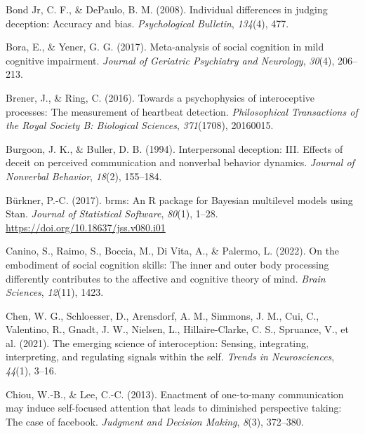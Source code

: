 \documentclass[
  man,mask,floatsintext]{apa6}
\newlength{\cslhangindent}
\newlength{\cslentryspacingunit} %
\newenvironment{CSLReferences}[2] %
 {%
  \setlength{\parindent}{0pt}
  \ifodd #1
  \let\oldpar\par
  \def\par{\hangindent=\cslhangindent\oldpar}
  \fi
  \setlength{\parskip}{#2\cslentryspacingunit}
 }%
 {}
\begin{document}
\begin{CSLReferences}{1}{0}
\leavevmode{}%
Bond Jr, C. F., \& DePaulo, B. M. (2008). Individual differences in judging deception: Accuracy and bias. \emph{Psychological Bulletin}, \emph{134}(4), 477.

\leavevmode{}%
Bora, E., \& Yener, G. G. (2017). Meta-analysis of social cognition in mild cognitive impairment. \emph{Journal of Geriatric Psychiatry and Neurology}, \emph{30}(4), 206--213.

\leavevmode{}%
Brener, J., \& Ring, C. (2016). Towards a psychophysics of interoceptive processes: The measurement of heartbeat detection. \emph{Philosophical Transactions of the Royal Society B: Biological Sciences}, \emph{371}(1708), 20160015.

\leavevmode{}%
Burgoon, J. K., \& Buller, D. B. (1994). Interpersonal deception: III. Effects of deceit on perceived communication and nonverbal behavior dynamics. \emph{Journal of Nonverbal Behavior}, \emph{18}(2), 155--184.

\leavevmode{}%
Bürkner, P.-C. (2017). {brms}: An {R} package for {Bayesian} multilevel models using {Stan}. \emph{Journal of Statistical Software}, \emph{80}(1), 1--28. \url{https://doi.org/10.18637/jss.v080.i01}

\leavevmode{}%
Canino, S., Raimo, S., Boccia, M., Di Vita, A., \& Palermo, L. (2022). On the embodiment of social cognition skills: The inner and outer body processing differently contributes to the affective and cognitive theory of mind. \emph{Brain Sciences}, \emph{12}(11), 1423.

\leavevmode{}%
Chen, W. G., Schloesser, D., Arensdorf, A. M., Simmons, J. M., Cui, C., Valentino, R., Gnadt, J. W., Nielsen, L., Hillaire-Clarke, C. S., Spruance, V., et al. (2021). The emerging science of interoception: Sensing, integrating, interpreting, and regulating signals within the self. \emph{Trends in Neurosciences}, \emph{44}(1), 3--16.

\leavevmode{}%
Chiou, W.-B., \& Lee, C.-C. (2013). Enactment of one-to-many communication may induce self-focused attention that leads to diminished perspective taking: The case of facebook. \emph{Judgment and Decision Making}, \emph{8}(3), 372--380.


\end{CSLReferences}
\end{document}
